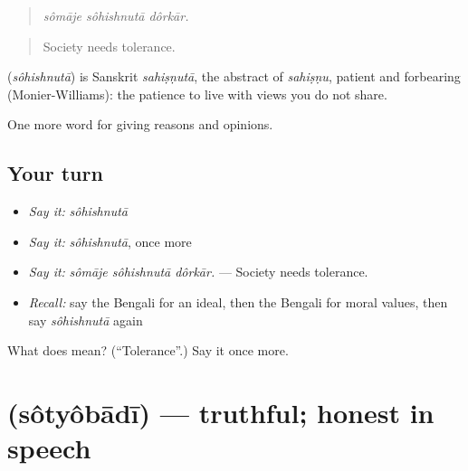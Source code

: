 \begin{quote}
  
\end{quote}

\begin{quote}
\emph{sômāje sôhishnutā dôrkār.}
\end{quote}

\begin{quote}
Society needs tolerance.
\end{quote}

\begin{cousinweb}
\textbf{} (\emph{sôhishnutā}) is Sanskrit \emph{sahiṣṇutā}, the abstract of \emph{sahiṣṇu}, patient and forbearing (Monier-Williams): the patience to live with views you do not share.
\end{cousinweb}

\begin{grammarlens}[title={What you've built}]
One more word for giving reasons and opinions.
\end{grammarlens}

\subsection*{Your turn}
\begin{itemize}
\raggedright
  \item \emph{Say it:} \emph{sôhishnutā}
  \item \emph{Say it:} \emph{sôhishnutā}, once more
  \item \emph{Say it:} \emph{sômāje sôhishnutā dôrkār.} — Society needs tolerance.
  \item \emph{Recall:} say the Bengali for an ideal, then the Bengali for moral values, then say \emph{sôhishnutā} again
\end{itemize}

\begin{tcolorbox}[breakable,colback=teal!4,colframe=teal!35!black,title={Before you move on}]
What does  mean? (\textquotedblleft{}Tolerance\textquotedblright{}.) Say it once more.
\end{tcolorbox}
\section[\texorpdfstring{\bn{সত্যবাদী} (sôtyôbādī)}{সত্যবাদী (sôtyôbādī)}]{ (sôtyôbādī) — truthful; honest in speech}

\label{lesson:BN-C350-sotyobadi}



